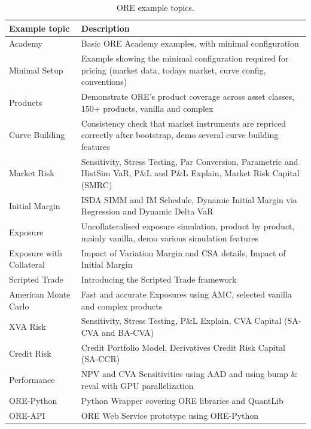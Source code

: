 \begin{table}[hbt]
\scriptsize
\begin{center}
\begin{tabular}{|l|p{8cm}|}
\hline
Example topic & Description \\
\hline
\hline
Academy & Basic ORE Academy examples, with minimal configuration \\
\hline
Minimal Setup & Example showing the minimal configuration required 
  for pricing (market data, todays market, curve config, conventions) \\
\hline
Products & Demonstrate ORE's product coverage across asset classes,
  150+ products, vanilla and complex \\
\hline
Curve Building & Consistency check that market instruments are repriced correctly
  after bootstrap, demo several curve building features \\
\hline
Market Risk & Sensitivity, Stress Testing, Par Conversion, Parametric and HistSim VaR,
  P\&L and P\&L Explain, Market Risk Capital (SMRC) \\
\hline
Initial Margin & ISDA SIMM and IM Schedule, Dynamic Initial Margin via Regression
  and Dynamic Delta VaR \\
\hline
Exposure & Uncollateralised exposure simulation, product by product, mainly vanilla,
  demo various simulation features \\
\hline
Exposure with Collateral & Impact of Variation Margin and CSA details,
  Impact of Initial Margin \\
\hline
Scripted Trade & Introducing the Scripted Trade framework \\
\hline
American Monte Carlo & Fast and accurate Exposures using AMC,
  selected vanilla and complex products \\
\hline
XVA Risk & Sensitivity, Stress Testing, P\&L Explain,
  CVA Capital (SA-CVA and BA-CVA) \\
\hline
Credit Risk & Credit Portfolio Model, Derivatives Credit Risk Capital (SA-CCR) \\
\hline
Performance & NPV and CVA Sensitivities using AAD
  and using bump \& reval with GPU parallelization \\
\hline
ORE-Python & Python Wrapper covering ORE libraries and QuantLib \\
\hline
ORE-API & ORE Web Service prototype using ORE-Python \\
\hline
\end{tabular}
\caption{ORE example topics.}
\label{tab_0}
\end{center}
\end{table}
\clearpage


